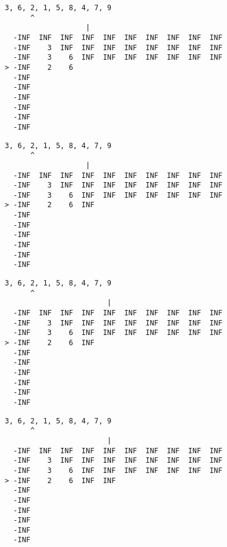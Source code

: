 { \begin{verbatim}
3, 6, 2, 1, 5, 8, 4, 7, 9
      ^
                   |
  -INF  INF  INF  INF  INF  INF  INF  INF  INF  INF
  -INF    3  INF  INF  INF  INF  INF  INF  INF  INF
  -INF    3    6  INF  INF  INF  INF  INF  INF  INF
> -INF    2    6                                   
  -INF                                             
  -INF                                             
  -INF                                             
  -INF                                             
  -INF                                             
  -INF                                             
\end{verbatim} }

{ \begin{verbatim}
3, 6, 2, 1, 5, 8, 4, 7, 9
      ^
                   |
  -INF  INF  INF  INF  INF  INF  INF  INF  INF  INF
  -INF    3  INF  INF  INF  INF  INF  INF  INF  INF
  -INF    3    6  INF  INF  INF  INF  INF  INF  INF
> -INF    2    6  INF                              
  -INF                                             
  -INF                                             
  -INF                                             
  -INF                                             
  -INF                                             
  -INF                                             
\end{verbatim} }

{ \begin{verbatim}
3, 6, 2, 1, 5, 8, 4, 7, 9
      ^
                        |
  -INF  INF  INF  INF  INF  INF  INF  INF  INF  INF
  -INF    3  INF  INF  INF  INF  INF  INF  INF  INF
  -INF    3    6  INF  INF  INF  INF  INF  INF  INF
> -INF    2    6  INF                              
  -INF                                             
  -INF                                             
  -INF                                             
  -INF                                             
  -INF                                             
  -INF                                             
\end{verbatim} }

{ \begin{verbatim}
3, 6, 2, 1, 5, 8, 4, 7, 9
      ^
                        |
  -INF  INF  INF  INF  INF  INF  INF  INF  INF  INF
  -INF    3  INF  INF  INF  INF  INF  INF  INF  INF
  -INF    3    6  INF  INF  INF  INF  INF  INF  INF
> -INF    2    6  INF  INF                         
  -INF                                             
  -INF                                             
  -INF                                             
  -INF                                             
  -INF                                             
  -INF                                             
\end{verbatim} }

